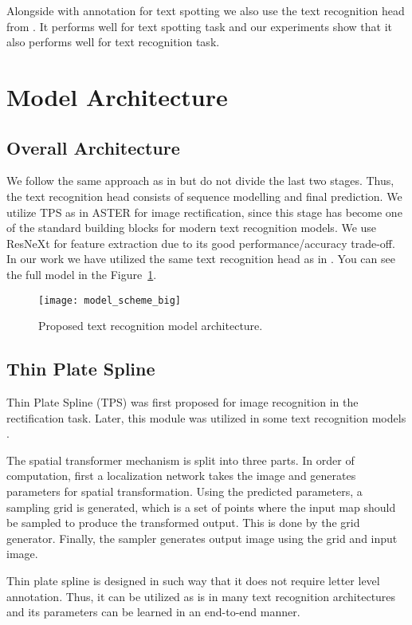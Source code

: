 \documentclass[runningheads]{llncs}
\begin{document}
Alongside with annotation for text spotting we also use the text recognition
head from \cite{krylov2021open}. It performs well for text spotting task and
our experiments show that it also performs well for text recognition task.

\section{Model Architecture}
\label{sec:model_arch}
\subsection{Overall Architecture}
We follow the same approach as in \cite{baek2019STRcomparisons} but do not divide the last two
stages. Thus, the text recognition head consists of sequence modelling and final prediction.
We utilize TPS \cite{tpsstn} as in ASTER \cite{aster} for image rectification, since this stage
has become one of the standard building blocks for modern text recognition models.
We use ResNeXt \cite{ResNeXt} for feature extraction due to its good performance/accuracy
trade-off. In our work we have utilized the same text recognition head as
in \cite{krylov2021open}. You can see the full model in the Figure~\ref{figure:model}.

\begin{figure}[t]
  \centering
  \texttt{[image: model\_scheme\_big]}
  \caption{Proposed text recognition model architecture. }
  \label{figure:model}
\end{figure}

\subsection{Thin Plate Spline}
Thin Plate Spline (TPS) \cite{tpsstn} was first proposed for image recognition in the
rectification task. Later, this module was utilized in some text recognition models
\cite{aster, qiao2020seed}.

The spatial transformer mechanism is split into three parts. In order of computation,
first a localization network takes the image and generates parameters for spatial transformation.
Using the predicted parameters, a sampling grid is generated, which is a set of points
where the input map should be sampled to produce the transformed output. This is done by
the grid generator. Finally, the sampler generates output image using the grid and input image.

Thin plate spline is designed in such way that it does not require letter level annotation.
Thus, it can be utilized as is in many text recognition architectures and its parameters
can be learned in an end-to-end manner.
\end{document}
